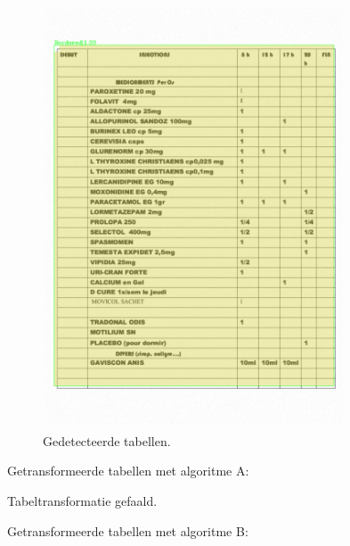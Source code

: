 \begin{figure}[H]
    \centering
    \includegraphics[width=0.8\textwidth]{test-resultaten/21/detected_tables.png}
    \caption{Gedetecteerde tabellen.}
\end{figure}

Getransformeerde tabellen met algoritme A:

Tabeltransformatie gefaald.

Getransformeerde tabellen met algoritme B:

